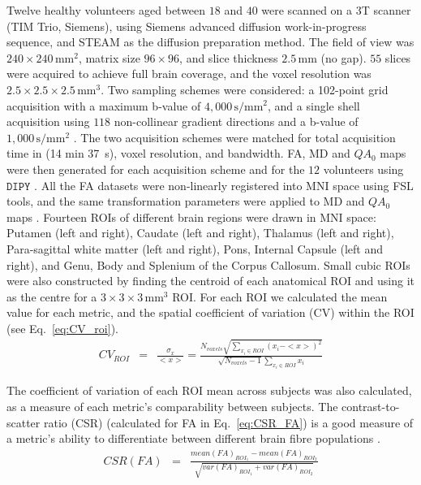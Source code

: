 \documentclass{bioinfo}
\begin{document}
Twelve healthy volunteers aged between $18$ and $40$ were scanned
on a 3T scanner (TIM Trio, Siemens), using Siemens advanced diffusion
work-in-progress sequence, and STEAM \citep{merboldt1992diffusion,MAB04}
as the diffusion preparation method. The field of view was $240\times240\,\textrm{mm}^{2}$,
matrix size $96\times96$, and slice thickness $2.5\,\textrm{mm}$
(no gap). $55$ slices were acquired to achieve full brain coverage,
and the voxel resolution was $2.5\times2.5\times2.5\,\textrm{mm}^{3}$.
Two sampling schemes were considered: a 102-point grid acquisition
with a maximum b-value of $4,000\,\textrm{s}/\textrm{mm}^{2}$, and
a single shell acquisition using $118$ non-collinear gradient directions
and a b-value of $1,000\,\textrm{s}/\textrm{mm}^{2}$ \citep{correia_garyfallidis2011}.
The two acquisition schemes were matched for total acquisition time
in (14 min 37~s), voxel resolution, and bandwidth. FA, MD and $QA_{0}$
maps were then generated for each acquisition scheme and for the $12$
volunteers using $\texttt{DIPY}$ \citep{garyfallidis2011dipy}. All
the FA datasets were non-linearly registered into MNI space using
FSL tools, and the same transformation parameters were applied to
MD and $QA_{0}$ maps . Fourteen ROIs of different brain regions were
drawn in MNI space: Putamen (left and right), Caudate (left and right),
Thalamus (left and right), Para-sagittal white matter (left and right),
Pons, Internal Capsule (left and right), and Genu, Body and Splenium
of the Corpus Callosum. Small cubic ROIs were also constructed by
finding the centroid of each anatomical ROI and using it as the centre
for a $3\times3\times3\,\mathrm{mm}^{3}$ ROI. For each ROI we calculated
the mean value for each metric, and the spatial coefficient of variation
(CV) within the ROI (see Eq.~\ref{eq:CV_roi}). \begin{eqnarray}
CV_{ROI} & = & \frac{\sigma_{x}}{<x>}=\frac{N_{voxels}\sqrt{\sum_{x_{i}\in ROI}(x_{i}-<x>)^{2}}}{\sqrt{N_{voxels}-1}\sum_{x_{i}\in ROI}x_{i}}\label{eq:CV_roi}\end{eqnarray}


The coefficient of variation of each ROI mean across subjects was
also calculated, as a measure of each metric\textquoteright{}s comparability
between subjects. The contrast-to-scatter ratio (CSR) (calculated
for FA in Eq.~\ref{eq:CSR_FA}) is a good measure of a metric\textquoteright{}s
ability to differentiate between different brain fibre populations
\citep{correia_garyfallidis2011}. \begin{eqnarray}
CSR(FA) & = & \frac{mean(FA)_{ROI_{1}}-mean(FA)_{ROI_{2}}}{\sqrt{var(FA)_{ROI_{1}}+var(FA)_{ROI_{2}}}}\label{eq:CSR_FA}\end{eqnarray}
\end{document}
